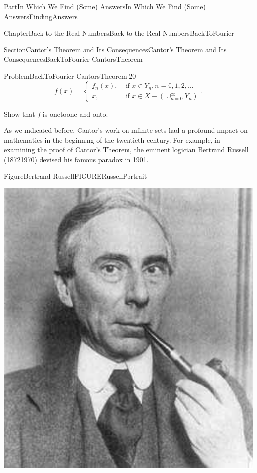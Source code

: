 \documentclass[oneside,10pt,]{book}
\numberwithin{equation}{part}
\newcommand{\amp}{&}
\begin{document}
\begin{partptx}{Part}{In Which We Find (Some) Answers}{}{In Which We Find (Some) Answers}{}{}{FindingAnswers}
\begin{chapterptx}{Chapter}{Back to the Real Numbers}{}{Back to the Real Numbers}{}{}{BackToFourier}
\begin{sectionptx}{Section}{Cantor's Theorem and Its Consequences}{}{Cantor's Theorem and Its Consequences}{}{}{BackToFourier-CantorsTheorem}
\begin{problem}{Problem}{}{BackToFourier-CantorsTheorem-20}
\begin{equation*}
f(x) =
\begin{cases}
f_n(x), \amp \text{ if }  x\in Y_n, n=0,1,2,\ldots\\
x, \amp \text{ if }  x\in X-\left(\cup_{n=0}^\infty Y_n \right) 
\end{cases}\text{.}
\end{equation*}
%
\par
Show that \(f\) is one\textendash{}to\textendash{}one and onto.%
\end{problem}
 As we indicated before, Cantor's  work on infinite sets had a profound impact on mathematics in the beginning of the twentieth century.  For example, in examining the proof of Cantor's Theorem, the eminent logician \href{https://mathshistory.st-andrews.ac.uk/Biographies/Russell/}{Bertrand Russell} (1872\textendash{}1970) devised his famous paradox in 1901.%
\begin{figureptx}{Figure}{Bertrand Russell}{FIGURERussellPortrait}{}%
%
%
\begin{image}{0.325}{0.35}{0.325}{}%
\includegraphics[width=\linewidth]{external/images/Russell.png}

\end{image}
\end{figureptx}
\end{sectionptx}
\end{chapterptx}
\end{partptx}
\end{document}
